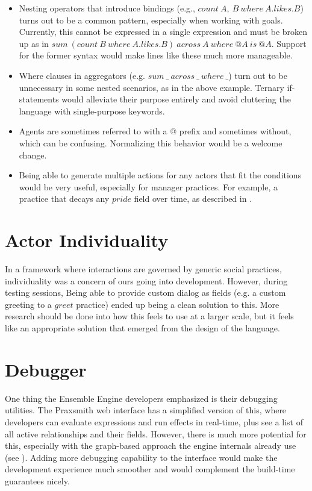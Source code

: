 \begin{itemize}
    \item Nesting operators that introduce bindings (e.g., $count\ A,\ B\ where\ A.likes.B$)
    turns out to be a common pattern, especially when working with goals. Currently,
    this cannot be expressed in a single expression and must be broken up as in
    $sum\ (count\ B\ where\ A.likes.B)\ across\ A\ where\ @A\ is\ @A$. Support for the
    former syntax would make lines like these much more manageable.
    \item Where clauses in aggregators (e.g. $sum\ \_\ across\ \_\ where\ \_$) turn out
    to be unnecessary in some nested scenarios, as in the above example. Ternary
    if-statements would alleviate their purpose entirely and avoid cluttering
    the language with single-purpose keywords.
    \item Agents are sometimes referred to with a $@$ prefix and sometimes without, which
    can be confusing. Normalizing this behavior would be a welcome change.
    \item Being able to generate multiple actions for any actors that fit the conditions
    would be very useful, especially for manager practices. For example, a practice that
    decays any $pride$ field over time, as described in .
\end{itemize}

\section{Actor Individuality} \label{sec:ActorIndividuality}

In a framework where interactions are governed by generic social practices, individuality
was a concern of ours going into development. However, during testing sessions,
Being able to provide custom dialog as fields (e.g. a custom greeting to a $greet$
practice) ended up being a clean solution to this. More research should be done into
how this feels to use at a larger scale, but it feels like an appropriate solution
that emerged from the design of the language.

\section{Debugger} \label{sec:Debugger}

One thing the Ensemble Engine developers emphasized is their debugging utilities. \cite{samuel_ensemble_2015} The Praxsmith
web interface has a simplified version of this, where developers can evaluate expressions
and run effects in real-time, plus see a list of all active relationships and their
fields. However, there is much more potential for this, especially with the graph-based
approach the engine internals already use (see ). Adding more debugging capability
to the interface would make the development experience much smoother and would complement
the build-time guarantees nicely.
